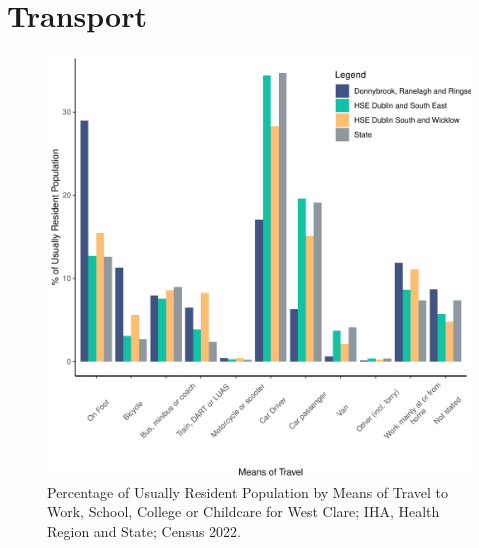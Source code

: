 \documentclass{article}
\begin{document}
\section{Transport}\label{sect:Trans}
\begin{figure}[H]
	\centering
	\includegraphics[width = 120mm]{../figures/TravelED.pdf}
	\caption{Percentage of Usually Resident Population by Means of Travel to Work, School, College or Childcare for West Clare; IHA, Health Region and State; Census 2022.}
	\label{fig:vbnv}
	\end{figure}
\end{document}
